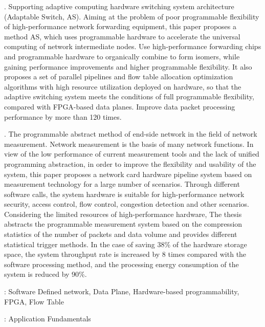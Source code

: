 . Supporting adaptive computing hardware switching system architecture (Adaptable Switch, AS).
Aiming at the problem of poor programmable flexibility of high-performance network forwarding equipment, this paper proposes a method AS, which uses programmable hardware to accelerate the universal computing of network intermediate nodes.
Use high-performance forwarding chips and programmable hardware to organically combine to form isomers, while gaining performance improvements and higher programmable flexibility. It also proposes a set of parallel pipelines and flow table allocation optimization algorithms with high resource utilization deployed on hardware, so that the adaptive switching system meets the conditions of full programmable flexibility, compared with FPGA-based data planes. Improve data packet processing performance by more than 120 times.\newline

. The programmable abstract method of end-side network in the field of network measurement.
Network measurement is the basis of many network functions. In view of the low performance of current measurement tools and the lack of unified programming abstraction, in order to improve the flexibility and usability of the system, this paper proposes a network card hardware pipeline system based on measurement technology for a large number of scenarios. Through different software calls, the system hardware is suitable for high-performance network security, access control, flow control, congestion detection and other scenarios.
Considering the limited resources of high-performance hardware,
The thesis abstracts the programmable measurement system based on the compression statistics of the number of packets and data volume and provides different statistical trigger methods.\newline
In the case of saving 38\% of the hardware storage space, the system throughput rate is increased by 8 times compared with the software processing method, and the processing energy consumption of the system is reduced by 90\%.


\vspace{\baselineskip}
: Software Defined network, Data Plane, Hardware-based programmability, FPGA, Flow Table



\vspace{\baselineskip}
: Application Fundamentals

\clearpage
